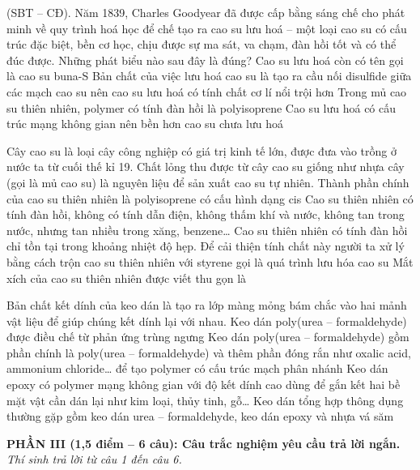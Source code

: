 \documentclass[11pt,a4paper]{article}
\def\loigiai#1{}
\begin{document}
\begin{ex}
(SBT -- CĐ). Năm 1839, Charles Goodyear đã được cấp bằng sáng chế cho phát minh về quy trình hoá học để chế tạo ra cao su lưu hoá -- một loại cao su có cấu trúc đặc biệt, bền cơ học, chịu được sự ma sát, va chạm, đàn hồi tốt và có thể đúc được. Những phát biểu nào sau đây là đúng?
\choiceTF
{Cao su lưu hoá còn có tên gọi là cao su buna-S}
{Bản chất của việc lưu hoá cao su là tạo ra cầu nối disulfide  giữa các mạch cao su nên cao su lưu hoá có tính chất cơ lí nổi trội hơn}
{Trong mủ cao su thiên nhiên, polymer có tính đàn hồi là polyisoprene}
{Cao su lưu hoá có cấu trúc mạng không gian nên bền hơn cao su chưa lưu hoá}
\loigiai{}
\end{ex}

\begin{ex}
Cây cao su là loại cây công nghiệp có giá trị kinh tế lớn, được đưa vào trồng ở nước ta từ cuối thế kỉ 19. Chất lỏng thu được từ cây cao su giống như nhựa cây (gọi là mủ cao su) là nguyên liệu để sản xuất cao su tự nhiên.
\choiceTF
{Thành phần chính của cao su thiên nhiên là polyisoprene có cấu hình dạng cis}
{Cao su thiên nhiên có tính đàn hồi, không có tính dẫn điện, không thấm khí và nước, không tan trong nước, nhưng tan nhiều trong xăng, benzene\dots}
{Cao su thiên nhiên có tính đàn hồi chỉ tồn tại trong khoảng nhiệt độ hẹp. Để cải thiện tính chất này người ta xử lý bằng cách trộn cao su thiên nhiên với styrene gọi là quá trình lưu hóa cao su}
{Mắt xích của cao su thiên nhiên được viết thu gọn là }
\loigiai{}
\end{ex}

\begin{ex}
Bản chất kết dính của keo dán là tạo ra lớp màng mỏng bám chắc vào hai mảnh vật liệu để giúp chúng kết dính lại với nhau.
\choiceTF
{Keo dán poly(urea -- formaldehyde) được điều chế từ phản ứng trùng ngưng}
{Keo dán poly(urea -- formaldehyde) gồm phần chính là poly(urea -- formaldehyde) và thêm phần đóng rắn như oxalic acid, ammonium chloride\dots{} để tạo polymer có cấu trúc mạch phân nhánh}
{Keo dán epoxy có polymer mạng không gian với độ kết dính cao dùng để gắn kết hai bề mặt vật cần dán lại như kim loại, thủy tinh, gỗ\dots}
{Keo dán tổng hợp thông dụng thường gặp gồm keo dán urea -- formaldehyde, keo dán epoxy và nhựa vá săm}
\loigiai{}
\end{ex}

\newpage

\noindent
\textbf{PHẦN III (1,5 điểm -- 6 câu): Câu trắc nghiệm yêu cầu trả lời ngắn.}\\
\textit{Thí sinh trả lời từ câu 1 đến câu 6.}
\end{document}
